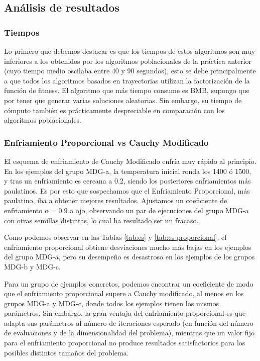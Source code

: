 \documentclass{article}
\begin{document}
\subsection{Análisis de resultados}

\subsubsection*{Tiempos}

Lo primero que debemos destacar es que los tiempos de estos algoritmos son muy inferiores a los obtenidos por los algoritmos
poblacionales de la práctica anterior (cuyo tiempo medio oscilaba entre 40 y 90 segundos), esto se debe principalmente
a que todos los algoritmos basados en trayectorias utilizan la factorización de la función de fitness. El algoritmo que 
más tiempo consume es BMB, supongo que por tener que generar varias soluciones aleatorias. Sin embargo, su tiempo de cómputo
también es prácticamente despreciable en comparación con los algoritmos poblacionales.

\subsubsection*{Enfriamiento Proporcional vs Cauchy Modificado}
El esquema de enfriamiento de Cauchy Modificado enfría muy rápido al principio. En los ejemplos del grupo MDG-a, la temperatura inicial
ronda los 1400 ó 1500, y tras un enfriamiento es cercana a 0.2, siendo los posteriores enfriamientos más paulatinos. Es por esto
que sospechamos que el Enfriamiento Proporcional, más paulatino, iba a obtener mejores resultados. Ajustamos un coeficiente
de enfriamiento $\alpha=0.9$ a ojo, observando un par de ejecuciones del grupo MDG-a con otras semillas distintas, lo cual
ha resultado ser un fracaso.

Como podemos observar en las Tablas \ref{tab:es} y \ref{tab:es-proporcional}, el enfriamiento proporcional obtiene desviaciones
mucho más bajas en los ejemplos del grupo MDG-a, pero su desempeño es desastroso en los ejemplos de los grupos MDG-b y MDG-c.

Para un grupo de ejemplos concretos, podemos encontrar un coeficiente de modo que el enfriamiento proporcional supere a
Cauchy modificado, al menos en los grupos MDG-a y MDG-c, donde todos los ejemplos tienen los mismos parámetros. Sin embargo,
la gran ventaja del enfriamiento proporcional es que adapta sus parámetros al número de iteraciones esperado (en función
del número de evaluaciones y de la dimensionalidad del problema), mientras que un valor fijo para el enfriamiento proporcional
no produce resultados satisfactorios para los posibles distintos tamaños del problema.
\end{document}
